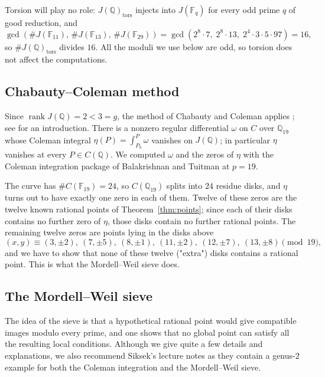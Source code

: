 \documentclass{article}
\theoremstyle{plain}
\newcommand{\Q}{\mathbb{Q}}
\newcommand{\F}{\mathbb{F}}
\newcommand{\tors}{\mathrm{tors}}
\begin{document}
Torsion will play no role: $J(\Q)_{\tors}$ injects into $J(\F_q)$ for
every odd prime $q$ of good reduction, and
\[
  \gcd\left(\#J(\F_{11}),\,\#J(\F_{13}),\,\#J(\F_{29})\right)
  =\gcd\left(2^8\cdot 7,\; 2^8\cdot 13,\; 2^4\cdot 3\cdot 5\cdot 97\right)=16,
\]
so $\#J(\Q)_{\tors}$ divides $16$. All the moduli we use below are odd,
so torsion does not affect the computations.

\subsection{Chabauty--Coleman method}

Since $\operatorname{rank} J(\Q)=2 < 3 = g$, the method of Chabauty and Coleman
applies \cite{Chabauty1941,Coleman1985}; see \cite{SiksekOhrid2014, McCallumPoonen2012} for an introduction. There is a nonzero regular differential $\omega$ on $C$ over
$\Q_{19}$ whose Coleman integral $\eta(P)=\int_{P_0}^{P}\omega$ vanishes on $J(\Q)$; in particular $\eta$ vanishes at every
$P\in C(\Q)$. We computed $\omega$ and the zeros of $\eta$ with the
Coleman integration package of Balakrishnan and Tuitman
\cite{BalakrishnanTuitman2020,BalakrishnanTuitmanCode} at $p=19$.

The curve has $\#C(\F_{19})=24$, so $C(\Q_{19})$ splits into $24$ residue
disks, and $\eta$ turns out to have exactly one zero in each of them.
Twelve of these zeros are the twelve known rational points of
Theorem~\ref{thm:points}; since each of their disks contains no further zero of
$\eta$, those disks contain no further rational points. The remaining twelve
zeros are points lying in the disks above
\[
  (x,y)\equiv (3,\pm 2),\ (7,\pm 5),\ (8,\pm 1),\ (11,\pm 2),\ (12,\pm 7),\
  (13,\pm 8) \pmod{19},
\]
and we have to show that none of these twelve ("extra") disks contains a
rational point. This is what the Mordell--Weil sieve does.

\subsection{The Mordell--Weil sieve}

The idea of the sieve \cite{Scharaschkin1999,Flynn2004,BruinStoll2010} is that
a hypothetical rational point would give compatible images modulo every
prime, and one shows that no global point can satisfy all the resulting local conditions. Although we give quite a few details and explanations, we also recommend Siksek's lecture notes \cite{SiksekOhrid2014} as they contain a genus-\(2\) example for both the Coleman integration and the Mordell--Weil sieve.
\end{document}
